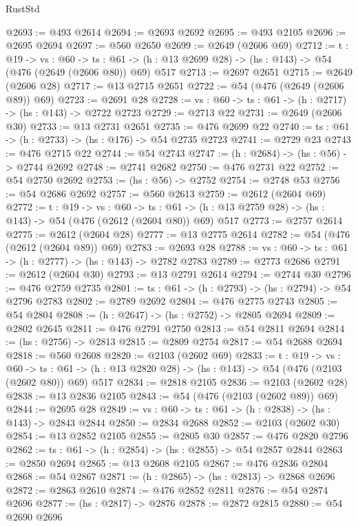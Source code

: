 \begin{lexlean}{RustStd}
\begin{coremodule}
@2693 := @493 @2614
@2694 := @2693 @2692
@2695 := @493 @2105
@2696 := @2695 @2694
@2697 := @560 @2650
@2699 := @2649 (@2606 @69)
@2712 := {t : @19} ->
  {vs : @60} ->
  {ts : @61} -> (h : @13 @2699 @28) -> (hs : @143) -> @54 (@476 (@2649 (@2606 @80)) @69) @517
@2713 := @2697 @2651
@2715 := @2649 (@2606 @28)
@2717 := @13 @2715 @2651
@2722 := @54 (@476 (@2649 (@2606 @89)) @69)
@2723 := @2691 @28
@2728 := {vs : @60} -> {ts : @61} -> (h : @2717) -> (hs : @143) -> @2722 @2723
@2729 := @2713 @22
@2731 := @2649 (@2606 @30)
@2733 := @13 @2731 @2651
@2735 := @476 @2699 @22
@2740 := {ts : @61} -> (h : @2733) -> (hs : @176) -> @54 @2735 @2723
@2741 := @2729 @23
@2743 := @476 @2715 @22
@2744 := @54 @2743
@2747 := (h : @2684) -> (hs : @56) -> @2744 @2692
@2748 := @2741 @2682
@2750 := @476 @2731 @22
@2752 := @54 @2750 @2692
@2753 := (hs : @56) -> @2752
@2754 := @2748 @53
@2756 := @54 @2686 @2692
@2757 := @560 @2613
@2759 := @2612 (@2604 @69)
@2772 := {t : @19} ->
  {vs : @60} ->
  {ts : @61} -> (h : @13 @2759 @28) -> (hs : @143) -> @54 (@476 (@2612 (@2604 @80)) @69) @517
@2773 := @2757 @2614
@2775 := @2612 (@2604 @28)
@2777 := @13 @2775 @2614
@2782 := @54 (@476 (@2612 (@2604 @89)) @69)
@2783 := @2693 @28
@2788 := {vs : @60} -> {ts : @61} -> (h : @2777) -> (hs : @143) -> @2782 @2783
@2789 := @2773 @2686
@2791 := @2612 (@2604 @30)
@2793 := @13 @2791 @2614
@2794 := @2744 @30
@2796 := @476 @2759 @2735
@2801 := {ts : @61} -> (h : @2793) -> (hs : @2794) -> @54 @2796 @2783
@2802 := @2789 @2692
@2804 := @476 @2775 @2743
@2805 := @54 @2804
@2808 := (h : @2647) -> (hs : @2752) -> @2805 @2694
@2809 := @2802 @2645
@2811 := @476 @2791 @2750
@2813 := @54 @2811 @2694
@2814 := (hs : @2756) -> @2813
@2815 := @2809 @2754
@2817 := @54 @2688 @2694
@2818 := @560 @2608
@2820 := @2103 (@2602 @69)
@2833 := {t : @19} ->
  {vs : @60} ->
  {ts : @61} -> (h : @13 @2820 @28) -> (hs : @143) -> @54 (@476 (@2103 (@2602 @80)) @69) @517
@2834 := @2818 @2105
@2836 := @2103 (@2602 @28)
@2838 := @13 @2836 @2105
@2843 := @54 (@476 (@2103 (@2602 @89)) @69)
@2844 := @2695 @28
@2849 := {vs : @60} -> {ts : @61} -> (h : @2838) -> (hs : @143) -> @2843 @2844
@2850 := @2834 @2688
@2852 := @2103 (@2602 @30)
@2854 := @13 @2852 @2105
@2855 := @2805 @30
@2857 := @476 @2820 @2796
@2862 := {ts : @61} -> (h : @2854) -> (hs : @2855) -> @54 @2857 @2844
@2863 := @2850 @2694
@2865 := @13 @2608 @2105
@2867 := @476 @2836 @2804
@2868 := @54 @2867
@2871 := (h : @2865) -> (hs : @2813) -> @2868 @2696
@2872 := @2863 @2610
@2874 := @476 @2852 @2811
@2876 := @54 @2874 @2696
@2877 := (hs : @2817) -> @2876
@2878 := @2872 @2815
@2880 := @54 @2690 @2696

\end{coremodule}
\end{lexlean}
